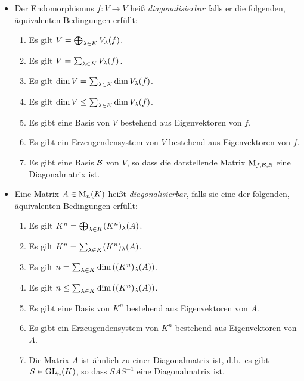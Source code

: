 \begin{definition}
  \leavevmode
  \begin{itemize}
    \item
      Der Endomorphismus $f \colon V \to V$ heiß \emph{diagonalisierbar} falls er die folgenden, äquivalenten Bedingungen erfüllt:
      \begin{enumerate}[label = \arabic*.]
        \item
          Es gilt $V = \bigoplus_{\lambda \in K} V_{\lambda}(f)$.
        \item
          Es gilt $V = \sum_{\lambda \in K} V_{\lambda}(f)$.
        \item
          Es gilt $\dim V = \sum_{\lambda \in K} \dim V_{\lambda}(f)$.
        \item
          Es gilt $\dim V \leq \sum_{\lambda \in K} \dim V_{\lambda}(f)$.
        \item
          Es gibt eine Basis von $V$ bestehend aus Eigenvektoren von $f$.
        \item
          Es gibt ein Erzeugendensystem von $V$ bestehend aus Eigenvektoren von $f$.
        \item
          Es gibt eine Basis $\mathcal{B}$ von $V$, so dass die darstellende Matrix $\operatorname{M}_{f, \mathcal{B}, \mathcal{B}}$ eine Diagonalmatrix ist.
      \end{enumerate}
    \item
      Eine Matrix $A \in \operatorname{M}_{n}(K)$ heißt \emph{diagonalisierbar}, falls sie eine der folgenden, äquivalenten Bedingungen erfüllt:
      \begin{enumerate}[label = \arabic*.]
        \item
          Es gilt $K^n = \bigoplus_{\lambda \in K} (K^n)_{\lambda}(A)$.
        \item
          Es gilt $K^n = \sum_{\lambda \in K} (K^n)_{\lambda}(A)$.
        \item
          Es gilt $n = \sum_{\lambda \in K} \dim \left((K^n)_{\lambda}(A) \right)$.
        \item
          Es gilt $n \leq \sum_{\lambda \in K} \dim \left((K^n)_{\lambda}(A) \right)$.
        \item
          Es gibt eine Basis von $K^n$ bestehend aus Eigenvektoren von $A$.
        \item
          Es gibt ein Erzeugendensystem von $K^n$ bestehend aus Eigenvektoren von $A$.
        \item
          Die Matrix $A$ ist ähnlich zu einer Diagonalmatrix ist, d.h.\ es gibt $S \in \operatorname{GL}_{n}(K)$, so dass $S A S^{-1}$ eine Diagonalmatrix ist.
      \end{enumerate}
  \end{itemize}
\end{definition}

